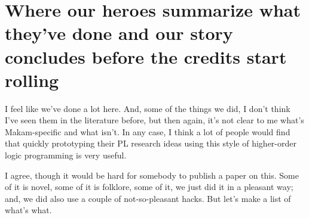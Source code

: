 \section{Where our heroes summarize what they've done and our story
concludes before the credits start
rolling}\label{where-our-heroes-summarize-what-theyve-done-and-our-story-concludes-before-the-credits-start-rolling}

\heroSTUDENT{} I feel like we've done a lot here. And, some of the things we
did, I don't think I've seen them in the literature before, but then
again, it's not clear to me what's Makam-specific and what isn't. In any
case, I think a lot of people would find that quickly prototyping their
PL research ideas using this style of higher-order logic programming is
very useful.

\heroADVISOR{} I agree, though it would be hard for somebody to publish a
paper on this. Some of it is novel, some of it is folklore, some of it,
we just did it in a pleasant way; and, we did also use a couple of
not-so-pleasant hacks. But let's make a list of what's what.

